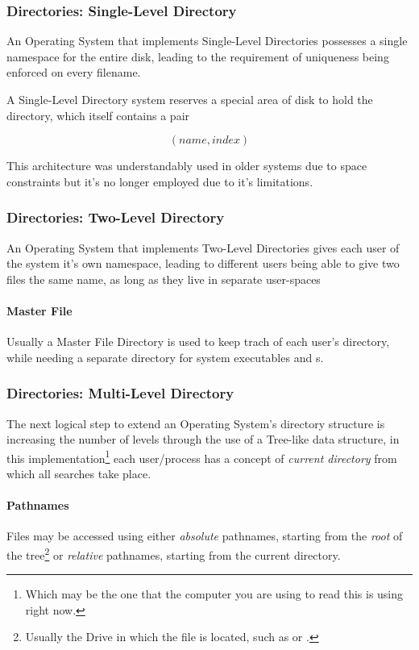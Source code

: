 \documentclass[openright, twoside]{report}
\theoremstyle{definition}
\theoremstyle{example}
\begin{document}
\subsubsection{Directories: Single-Level Directory}
An Operating System that implements Single-Level Directories possesses 
a single namespace for the entire disk, leading to the requirement of 
uniqueness being enforced on every filename. 

A Single-Level Directory system reserves a special area of disk to 
hold the directory, which itself contains a pair 

\[(name, index)\]

This architecture was understandably used in older systems due to 
space constraints but it's no longer employed due to it's limitations. 

\subsubsection{Directories: Two-Level Directory}
An Operating System that implements Two-Level Directories gives 
each user of the system it's own namespace, leading to different users
being able to give two files the same name, as long as they live in separate 
user-spaces

\paragraph{Master File}
Usually a Master File Directory is used to keep trach of each user's directory,
while needing a separate directory for system executables and s.

\subsubsection{Directories: Multi-Level Directory}
The next logical step to extend an Operating System's directory structure is 
increasing the number of levels through the use of a Tree-like data structure, 
in this implementation\footnote{Which may be the one that the computer 
you are using to read this is using right now.} each user/process has a 
concept of \emph{current directory} from which all searches take place.

\paragraph{Pathnames}
Files may be accessed using either \emph{absolute} pathnames, starting from the 
\emph{root} of the tree\footnote{Usually the Drive in which the file is 
located, such as  or .} or \emph{relative} pathnames, starting from 
the current directory.
\end{document}
